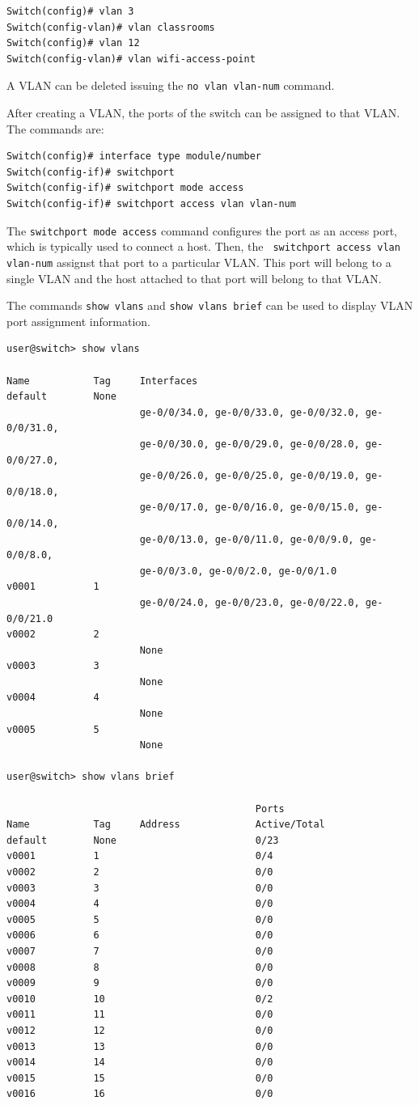 \begin{lstlisting}
Switch(config)# vlan 3
Switch(config-vlan)# vlan classrooms
Switch(config)# vlan 12
Switch(config-vlan)# vlan wifi-access-point
\end{lstlisting}

A VLAN can be deleted issuing the \texttt{no vlan vlan-num} command.

After creating a VLAN, the ports of the switch can be assigned to that VLAN.
The commands are:
\begin{lstlisting}
Switch(config)# interface type module/number
Switch(config-if)# switchport
Switch(config-if)# switchport mode access
Switch(config-if)# switchport access vlan vlan-num
\end{lstlisting}

The \texttt{switchport mode access} command configures the port as an access port, which is typically used to connect a host.
Then, the \texttt{ switchport access vlan vlan-num} assignst that port to a particular VLAN.
This port will belong to a single VLAN and the host attached to that port will belong to that VLAN.

The commands \texttt{show vlans} and \texttt{show vlans brief} can be used to display VLAN port assignment information.

\begin{lstlisting}
user@switch> show vlans

Name           Tag     Interfaces
default        None
                       ge-0/0/34.0, ge-0/0/33.0, ge-0/0/32.0, ge-0/0/31.0,
                       ge-0/0/30.0, ge-0/0/29.0, ge-0/0/28.0, ge-0/0/27.0,
                       ge-0/0/26.0, ge-0/0/25.0, ge-0/0/19.0, ge-0/0/18.0,
                       ge-0/0/17.0, ge-0/0/16.0, ge-0/0/15.0, ge-0/0/14.0,
                       ge-0/0/13.0, ge-0/0/11.0, ge-0/0/9.0, ge-0/0/8.0,
                       ge-0/0/3.0, ge-0/0/2.0, ge-0/0/1.0
v0001          1
                       ge-0/0/24.0, ge-0/0/23.0, ge-0/0/22.0, ge-0/0/21.0
v0002          2
                       None
v0003          3
                       None
v0004          4
                       None
v0005          5
                       None

user@switch> show vlans brief

                                           Ports
Name           Tag     Address             Active/Total
default        None                        0/23
v0001          1                           0/4
v0002          2                           0/0
v0003          3                           0/0
v0004          4                           0/0
v0005          5                           0/0
v0006          6                           0/0
v0007          7                           0/0
v0008          8                           0/0
v0009          9                           0/0
v0010          10                          0/2
v0011          11                          0/0
v0012          12                          0/0
v0013          13                          0/0
v0014          14                          0/0
v0015          15                          0/0
v0016          16                          0/0

\end{lstlisting}

